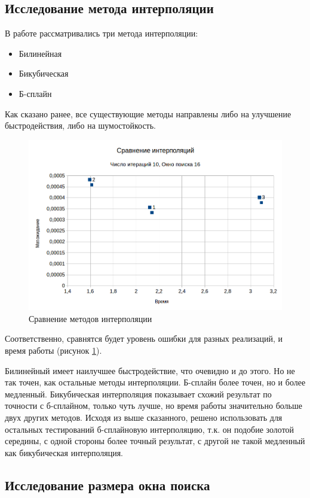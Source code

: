 \subsection{Исследование метода интерполяции}
В работе рассматривались три метода интерполяции:
\begin{itemize}
\item Билинейная
\item Бикубическая
\item Б-сплайн
\end{itemize}
Как сказано ранее, все существующие методы направлены либо на улучшение быстродействия, либо на шумостойкость. 
\begin{figure}
\centering
\includegraphics[width=0.8\linewidth]{images/inter_err}
\caption{Сравнение методов интерполяции}
\label{fig:inter_err}
\end{figure}
Соответственно, сравнятся будет уровень ошибки для разных реализаций, и время работы (рисунок \ref{fig:inter_err}).

Билинейный имеет наилучшее быстродействие, что очевидно и до этого. Но не так точен, как остальные методы интерполяции. Б-сплайн более точен, но и более медленный. Бикубическая интерполяция показывает схожий результат по точности с б-сплайном, только чуть лучше, но время работы значительно больше двух других методов. Исходя из выше сказанного, решено использовать для остальных тестирований б-сплайновую интерполяцию, т.к. он подобие золотой середины, с одной стороны более точный результат, с другой не такой медленный как бикубическая интерполяция. 
\subsection{Исследование размера окна поиска}

